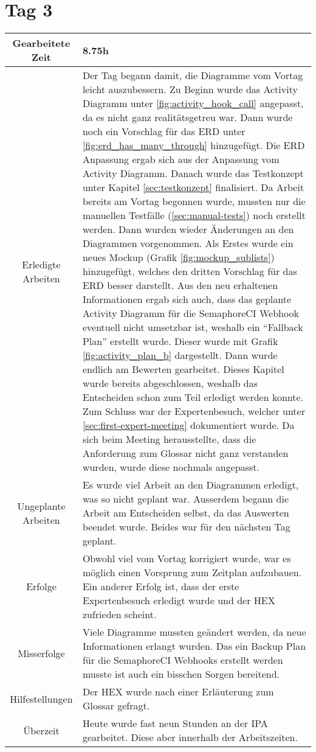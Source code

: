 \section{Tag 3}
\begin{tabularx}{\textwidth}[H]{|c|X|}
  \hline
  Gearbeitete Zeit & 8.75h \\ \hline
  Erledigte Arbeiten & Der Tag begann damit, die Diagramme vom Vortag leicht auszubessern. Zu
  Beginn wurde das Activity Diagramm unter \ref{fig:activity_hook_call} angepasst, da es nicht
  ganz realitätsgetreu war. Dann wurde noch ein Vorschlag für das ERD unter
  \ref{fig:erd_has_many_through} hinzugefügt. Die ERD Anpassung ergab sich aus der Anpassung
  vom Activity Diagramm. \newline
  Danach wurde das Testkonzept unter Kapitel \ref{sec:testkonzept} finalisiert. Da Arbeit bereits
  am Vortag begonnen wurde, mussten nur die manuellen Testfälle (\ref{sec:manual-tests}) noch erstellt
  werden. \newline
  Dann wurden wieder Änderungen an den Diagrammen vorgenommen. Als Erstes wurde ein neues Mockup
  (Grafik \ref{fig:mockup_sublists}) hinzugefügt, welches den dritten Vorschlag für das ERD
  besser darstellt. Aus den neu erhaltenen Informationen ergab sich auch, dass das geplante Activity Diagramm
  für die SemaphoreCI Webhook eventuell nicht umsetzbar ist, weshalb ein \enquote{Fallback Plan}
  erstellt wurde. Dieser wurde mit Grafik \ref{fig:activity_plan_b} dargestellt. \newline
  Dann wurde endlich am Bewerten gearbeitet. Dieses Kapitel wurde bereits abgeschlossen, weshalb
  das Entscheiden schon zum Teil erledigt werden konnte. \newline
  Zum Schluss war der Expertenbesuch, welcher unter \ref{sec:first-expert-meeting} dokumentiert wurde.
  Da sich beim Meeting herausstellte, dass die Anforderung zum Glossar nicht ganz verstanden wurden,
  wurde diese nochmals angepasst. \\ \hline
  Ungeplante Arbeiten & Es wurde viel Arbeit an den Diagrammen erledigt, was so nicht geplant war. Ausserdem
  begann die Arbeit am Entscheiden selbst, da das Auswerten beendet wurde. Beides war für den nächsten Tag
  geplant. \\ \hline
  Erfolge & Obwohl viel vom Vortag korrigiert wurde, war es möglich einen Vorsprung zum Zeitplan aufzubauen.
  Ein anderer Erfolg ist, dass der erste Expertenbesuch erledigt wurde und der HEX zufrieden scheint. \\ \hline
  Misserfolge & Viele Diagramme mussten geändert werden, da neue Informationen erlangt wurden. Das ein Backup
  Plan für die SemaphoreCI Webhooks erstellt werden musste ist auch ein bisschen Sorgen bereitend. \\ \hline
  Hilfestellungen & Der HEX wurde nach einer Erläuterung zum Glossar gefragt. \\ \hline
  Überzeit & Heute wurde fast neun Stunden an der IPA gearbeitet. Diese aber innerhalb der Arbeitszeiten. \\ \hline
\end{tabularx}

